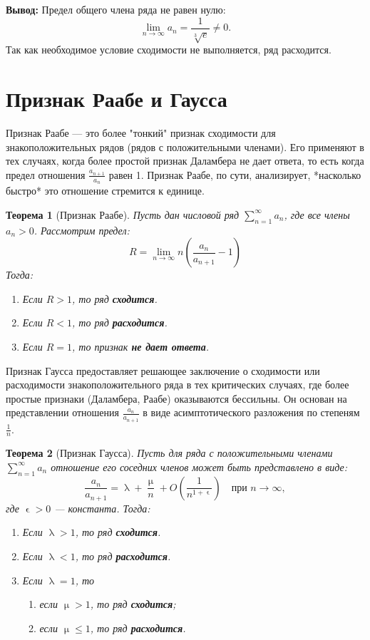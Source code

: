 \documentclass[a4paper, 12pt]{report}
\numberwithin{equation}{section}
\renewcommand{\lambda}{\uplambda}
\renewcommand{\mu}{\upmu}
\renewcommand{\epsilon}{\upvarepsilon}
\newtheorem*{theorem}{Теорема}
\begin{document}
	\textbf{Вывод:}
	Предел общего члена ряда не равен нулю:
	$$ \lim_{n \to \infty} a_n = \frac{1}{\sqrt[3]{e}} \neq 0. $$
	Так как необходимое условие сходимости не выполняется, ряд расходится.
	\section{Признак Раабе и Гаусса}
	Признак Раабе — это более "тонкий" признак сходимости для знакоположительных рядов (рядов с положительными членами). Его применяют в тех случаях, когда более простой признак Даламбера не дает ответа, то есть когда предел отношения $\frac{a_{n+1}}{a_n}$ равен 1. Признак Раабе, по сути, анализирует, *насколько быстро* это отношение стремится к единице.
	\begin{theorem}
		[Признак Раабе]
			Пусть дан числовой ряд $\sum_{n=1}^{\infty} a_n$, где все члены $a_n > 0$.
		Рассмотрим предел:
		$$ R = \lim_{n \to \infty} n \left( \frac{a_n}{a_{n+1}} - 1 \right) $$
		Тогда:
		\begin{enumerate}
			\item Если $R > 1$, то ряд \textbf{сходится}.
			\item Если $R < 1$, то ряд \textbf{расходится}.
			\item Если $R = 1$, то признак \textbf{не дает ответа}.
		\end{enumerate}
	\end{theorem}
	\noindent
	Признак Гаусса предоставляет решающее заключение о сходимости или расходимости знакоположительного ряда в тех критических случаях, где более простые признаки (Даламбера, Раабе) оказываются бессильны. Он основан на представлении отношения $\frac{a_n}{a_{n+1}}$ в виде асимптотического разложения по степеням $\frac{1}{n}$.
	\begin{theorem}[Признак Гаусса]
		Пусть для ряда с положительными членами $\sum_{n=1}^{\infty} a_n$ отношение его соседних членов может быть представлено в виде:
		$$ \frac{a_n}{a_{n+1}} = \lambda + \frac{\mu}{n} + O\left(\frac{1}{n^{1+\epsilon}}\right) \quad \text{при } n \to \infty, $$
		где $\epsilon > 0$ — константа.
		Тогда:
		\begin{enumerate}
			\item Если $\lambda > 1$, то ряд \textbf{сходится}.
			\item Если $\lambda < 1$, то ряд \textbf{расходится}.
			\item Если $\lambda = 1$, то 
			\begin{enumerate}
				\item[а)] если $\mu > 1$, то ряд \textbf{сходится};
				\item[б)] если $\mu \le 1$, то ряд \textbf{расходится}.
			\end{enumerate}
		\end{enumerate}
	\end{theorem}
\end{document}
